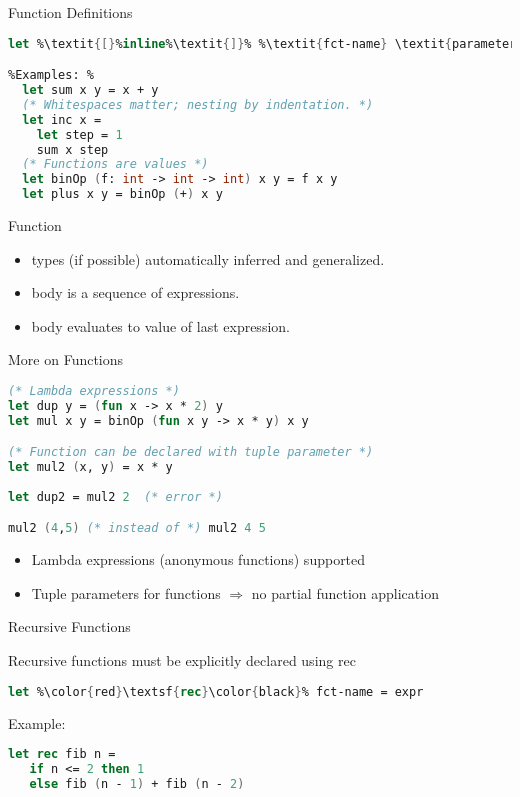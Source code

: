 \documentclass{beamer}
\newcommand{\Blue}[1]{\color{blue}#1\color{black}\xspace}
\begin{document}
\begin{frame}[fragile]{Function Definitions}
\begin{lstlisting}[language=FSharp, escapechar=\%]
 let %\textit{[}%inline%\textit{]}% %\textit{fct-name} \textit{parameter-list [}%:%\textit{return-type ]}% = %\textit{fct-body}%

%Examples: %
  let sum x y = x + y
  (* Whitespaces matter; nesting by indentation. *) 
  let inc x =
    let step = 1
    sum x step
  (* Functions are values *)
  let binOp (f: int -> int -> int) x y = f x y
  let plus x y = binOp (+) x y
\end{lstlisting}
Function
\begin{itemize}
\item<+-> types (if possible) automatically inferred and generalized.
\item<+-> body is a sequence of expressions.
\item<+-> body evaluates to value of last expression.
\end{itemize}

\end{frame}

\begin{frame}[fragile]{More on Functions}
\begin{lstlisting}[language=FSharp, escapechar=\%]
(* Lambda expressions *)
let dup y = (fun x -> x * 2) y
let mul x y = binOp (fun x y -> x * y) x y

(* Function can be declared with tuple parameter *)
let mul2 (x, y) = x * y 
  
let dup2 = mul2 2  (* error *)

mul2 (4,5) (* instead of *) mul2 4 5
\end{lstlisting}  
\begin{itemize}
  \item Lambda expressions (anonymous functions) supported
  \item Tuple parameters for functions $\Rightarrow$ no partial function application
\end{itemize}
\end{frame}


\begin{frame}[fragile]{Recursive Functions}

\Blue{Recursive functions must be explicitly declared using \alert{rec}}

\begin{center}
\begin{lstlisting}[language=FSharp, escapechar=\%]
let %\color{red}\textsf{rec}\color{black}% fct-name = expr
\end{lstlisting}  
\end{center}

Example:

\begin{lstlisting}[language=FSharp, escapechar=\%]
let rec fib n =
   if n <= 2 then 1
   else fib (n - 1) + fib (n - 2)
\end{lstlisting}  

\end{frame}
\end{document}
